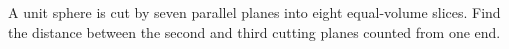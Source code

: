 A unit sphere is cut by seven parallel planes into eight equal-volume slices. Find the distance between the second and third cutting planes counted from one end.
